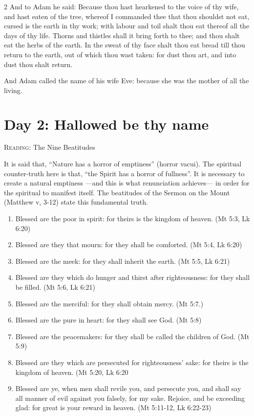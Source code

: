 \begin{multicols}{2}
And to Adam he said: Because thou hast hearkened to the voice of thy wife, and hast eaten of the tree, whereof I commanded thee that thou shouldst not eat, cursed is the earth in thy work; with labour and toil shalt thou eat thereof all the days of thy life. Thorns and thistles shall it bring forth to thee; and thou shalt eat the herbs of the earth. In the sweat of thy face shalt thou eat bread till thou return to the earth, out of which thou wast taken: for dust thou art, and into dust thou shalt return.

And Adam called the name of his wife Eve: because she was the mother of all the living. 
\end{multicols}

\section{Day 2: Hallowed be thy name}
\textsc{Reading}: The Nine Beatitudes

\begin{quotex}
It is said that, ``Nature has a horror of emptiness'' (horror vacui). The spiritual counter-truth here is that, ``the Spirit has a horror of fullness''. It is necessary to create a natural emptiness —and this is what renunciation achieves— in order for the spiritual to manifest itself. The beatitudes of the Sermon on the Mount (Matthew v, 3-12) state this fundamental truth. 


\end{quotex}

\begin{enumerate}
\item Blessed are the poor in spirit: for theirs is the kingdom of heaven. (Mt 5:3, Lk 6:20) 
\item Blessed are they that mourn: for they shall be comforted. (Mt 5:4, Lk 6:20) 
\item Blessed are the meek: for they shall inherit the earth. (Mt 5:5, Lk 6:21) 
\item Blessed are they which do hunger and thirst after righteousness: for they shall be filled. (Mt 5:6, Lk 6:21) 
\item Blessed are the merciful: for they shall obtain mercy. (Mt 5:7.) 
\item Blessed are the pure in heart: for they shall see God. (Mt 5:8) 
\item Blessed are the peacemakers: for they shall be called the children of God. (Mt 5:9) 
\item Blessed are they which are persecuted for righteousness' sake: for theirs is the kingdom of
heaven. (Mt 5:20, Lk 6:20 
\item Blessed are ye, when men shall revile you, and persecute you, and shall say all manner of evil against you
falsely, for my sake. Rejoice, and be exceeding glad: for great is your reward in heaven. (Mt 5:11-12, Lk 6:22-23) 
\end{enumerate}

